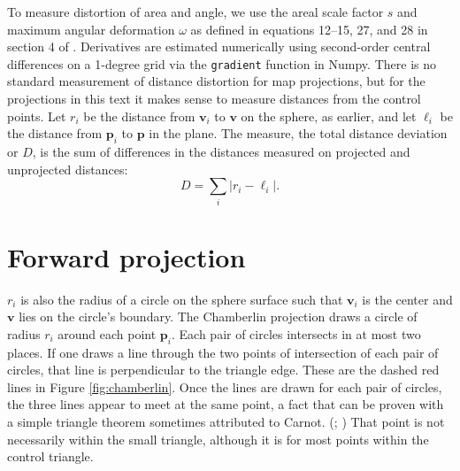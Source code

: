 \documentclass[]{interact}
\begin{document}
To measure distortion of area and angle, we use the areal scale factor $s$ and
maximum angular deformation $\omega$ as defined in equations 12--15, 27, and 28
in section 4 of \citet{snyder87}. Derivatives are estimated numerically using
second-order central differences on a 1-degree grid via the \texttt{gradient}
function in Numpy. \citep{numpy} There is no standard measurement of distance
distortion for map projections, but for the projections in this text it makes
sense to measure distances from the control points. Let $r_i$ be the
distance from $\mathbf v_i$ to $\mathbf v$ on the sphere, as earlier, and let
$\ell_i$ be the distance from $\mathbf p_i$ to $\mathbf p$ in the plane.
The measure, the total distance deviation or $D$, is the sum of differences
in the distances measured on projected and unprojected distances:
\begin{equation}
 D = \sum_i \left| r_i - \ell_i \right|.
\end{equation}

\section{Forward projection}

$r_i$ is also the radius of a circle on the sphere surface such that
$\mathbf v_i$ is the center and $\mathbf v$ lies on the circle's boundary.
The Chamberlin projection draws a circle of radius $r_i$ around each point
$\mathbf p_i$. Each pair of circles intersects in at most two places. If
one draws a line through the two points of intersection of each pair of circles,
that line is perpendicular to the triangle edge. These are the dashed red lines
in Figure \ref{fig:chamberlin}. Once the lines are drawn for each pair of
circles, the three lines appear to meet at the same point, a fact that can be
proven with a simple triangle theorem sometimes attributed to Carnot.
(\citealp{posamentier}; \citealp{wohlgemuth})
That point is not necessarily within
the small triangle, although it is for most points within the control triangle.
\end{document}
